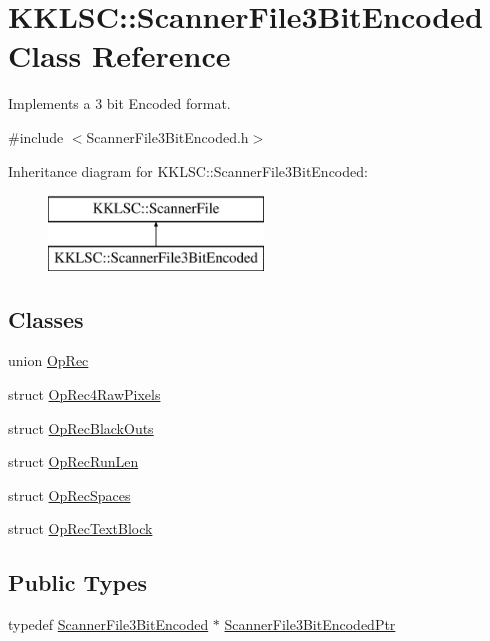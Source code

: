 \hypertarget{class_k_k_l_s_c_1_1_scanner_file3_bit_encoded}{}\section{K\+K\+L\+SC\+:\+:Scanner\+File3\+Bit\+Encoded Class Reference}
\label{class_k_k_l_s_c_1_1_scanner_file3_bit_encoded}


Implements a 3 bit Encoded format.  




{\ttfamily \#include $<$Scanner\+File3\+Bit\+Encoded.\+h$>$}

Inheritance diagram for K\+K\+L\+SC\+:\+:Scanner\+File3\+Bit\+Encoded\+:\begin{figure}[H]
\begin{center}
\leavevmode
\includegraphics[height=2.000000cm]{class_k_k_l_s_c_1_1_scanner_file3_bit_encoded}
\end{center}
\end{figure}
\subsection*{Classes}
\begin{DoxyCompactItemize}
\item 
union \hyperlink{union_scanner_file3_bit_encoded_1_1_op_rec}{Op\+Rec}
\item 
struct \hyperlink{struct_scanner_file3_bit_encoded_1_1_op_rec4_raw_pixels}{Op\+Rec4\+Raw\+Pixels}
\item 
struct \hyperlink{struct_scanner_file3_bit_encoded_1_1_op_rec_black_outs}{Op\+Rec\+Black\+Outs}
\item 
struct \hyperlink{struct_scanner_file3_bit_encoded_1_1_op_rec_run_len}{Op\+Rec\+Run\+Len}
\item 
struct \hyperlink{struct_scanner_file3_bit_encoded_1_1_op_rec_spaces}{Op\+Rec\+Spaces}
\item 
struct \hyperlink{struct_scanner_file3_bit_encoded_1_1_op_rec_text_block}{Op\+Rec\+Text\+Block}
\end{DoxyCompactItemize}
\subsection*{Public Types}
\begin{DoxyCompactItemize}
\item 
typedef \hyperlink{class_k_k_l_s_c_1_1_scanner_file3_bit_encoded}{Scanner\+File3\+Bit\+Encoded} $\ast$ \hyperlink{class_k_k_l_s_c_1_1_scanner_file3_bit_encoded_a66c1adc8777dad15155ad88fb3cf77ff}{Scanner\+File3\+Bit\+Encoded\+Ptr}
\end{DoxyCompactItemize}
